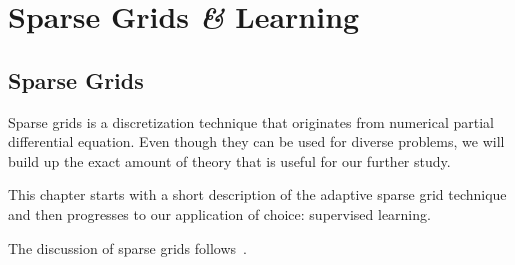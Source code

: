 \chapter{Sparse Grids \textit{\&} Learning}

\section{Sparse Grids}
Sparse grids is a discretization technique that originates from numerical
partial differential equation.
Even though they can be used for diverse problems, we will build up
the exact amount of theory that is useful for our further study.

This chapter starts with a short description of the adaptive sparse grid
technique and then progresses to our application of choice: supervised learning.

The discussion of sparse grids
follows~\cite{bungartzSparse,spatAdaptGrid,sparse-parsimony}.

